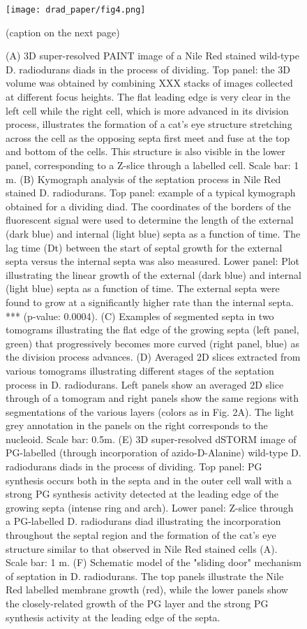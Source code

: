 \begin{figure}[ht]
    \centering
    \texttt{[image: drad\_paper/fig4.png]}
    \caption[Septation through a "sliding door" mechanism]{(caption on the next page)}
    \label{drad_fig4}
\end{figure}
\begin{figure}[ht]
    \ContinuedFloat
    \caption{(A) 3D super-resolved PAINT image of a Nile Red stained wild-type D. radiodurans diads in the process of dividing. Top panel: the 3D volume was obtained by combining XXX stacks of images collected at different focus heights. The flat leading edge is very clear in the left cell while the right cell, which is more advanced in its division process, illustrates the formation of a cat's eye structure stretching across the cell as the opposing septa first meet and fuse at the top and bottom of the cells. This structure is also visible in the lower panel, corresponding to a Z-slice through a labelled cell. Scale bar: 1 \mu{}m. (B) Kymograph analysis of the septation process in Nile Red stained D. radiodurans. Top panel: example of a typical kymograph obtained for a dividing diad. The coordinates of the borders of the fluorescent signal were used to determine the length of the external (dark blue) and internal (light blue) septa as a function of time. The lag time (Dt) between the start of septal growth for the external septa versus the internal septa was also measured. Lower panel: Plot illustrating the linear growth of the external (dark blue) and internal (light blue) septa as a function of time. The external septa were found to grow at a significantly higher rate than the internal septa. *** (p-value: 0.0004). (C) Examples of segmented septa in two tomograms illustrating the flat edge of the growing septa (left panel, green) that progressively becomes more curved (right panel, blue) as the division process advances. (D) Averaged 2D slices extracted from various tomograms illustrating different stages of the septation process in D. radiodurans. Left panels show an averaged 2D slice through of a tomogram and right panels show the same regions with segmentations of the various layers (colors as in Fig. 2A). The light grey annotation in the panels on the right corresponds to the nucleoid. Scale bar: 0.5\mu{}m. (E) 3D super-resolved dSTORM image of PG-labelled (through incorporation of azido-D-Alanine) wild-type D. radiodurans diads in the process of dividing. Top panel: PG synthesis occurs both in the septa and in the outer cell wall with a strong PG synthesis activity detected at the leading edge of the growing septa (intense ring and arch). Lower panel: Z-slice through a PG-labelled D. radiodurans diad illustrating the incorporation throughout the septal region and the formation of the cat's eye structure similar to that observed in Nile Red stained cells (A). Scale bar: 1 \mu{}m. (F) Schematic model of the "sliding door" mechanism of septation in D. radiodurans. The top panels illustrate the Nile Red labelled membrane growth (red), while the lower panels show the closely-related growth of the PG layer and the strong PG synthesis activity at the leading edge of the septa.}
\end{figure}

